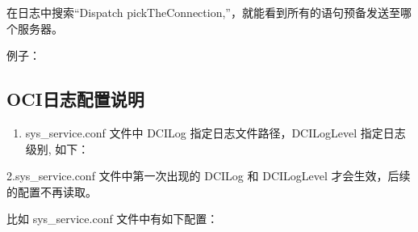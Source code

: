 \documentclass[a4,10pt,oneside,english]{sphinxmanual}
\begin{document}
在日志中搜索“Dispatch pickTheConnection,”，就能看到所有的语句预备发送至哪个服务器。

例子：

\begin{sphinxVerbatim}[commandchars=\\\{\}]
\PYG{p}{[}\PYG{p}{]}\PYG{p}{[} \PYG{p}{]}              
\end{sphinxVerbatim}


\subsection{OCI日志配置说明}
\label{\detokenize{interface/oci-v7:id2}}\begin{enumerate}
%
\item {} 
sys\_service.conf 文件中 DCILog 指定日志文件路径，DCILogLevel 指定日志级别, 如下：

\end{enumerate}

\begin{sphinxVerbatim}[commandchars=\\\{\}]
\end{sphinxVerbatim}

2.sys\_service.conf 文件中第一次出现的 DCILog 和 DCILogLevel 才会生效，后续的配置不再读取。

比如 sys\_service.conf 文件中有如下配置：

\begin{sphinxVerbatim}[commandchars=\\\{\}]
\PYG{p}{[}\PYG{p}{]}

\PYG{p}{[}\PYG{p}{]}
\end{sphinxVerbatim}
\end{document}
